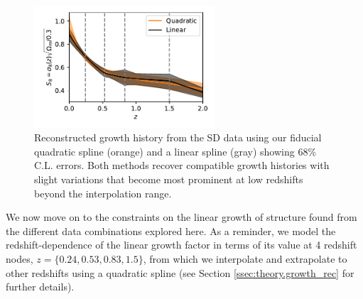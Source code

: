 \documentclass[a4paper,11pt]{article}
\newcommand{\southd}{SD\xspace}
\begin{document}
      \begin{figure}
        \centering
        \includegraphics[width=0.6\textwidth]{figures/SD_splines.pdf}
        \caption{Reconstructed growth history from the \southd data using our fiducial quadratic spline (orange) and a linear spline (gray) showing 68\% C.L. errors. Both methods recover compatible growth histories with slight variations that become most prominent at low redshifts beyond the interpolation range.}\label{fig:splines}
      \end{figure}

      We now move on to the constraints on the linear growth of structure found from the different data combinations explored here. As a reminder, we model the redshift-dependence of the linear growth factor in terms of its value at 4 redshift nodes, $z = \{0.24, 0.53, 0.83, 1.5\}$, from which we interpolate and extrapolate to other redshifts using a quadratic spline (see Section \ref{ssec:theory.growth_rec} for further details).
\end{document}

